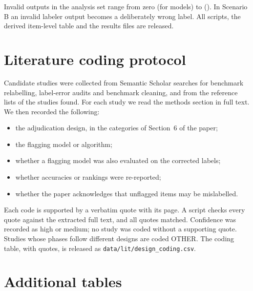\documentclass[twoside,11pt]{article}
\begin{document}
Invalid outputs in the analysis set range from zero (for \invalidZero{} models) to \invalidMax{} (\invalidMaxModel). In Scenario B an invalid labeler output becomes a deliberately wrong label. All scripts, the derived item-level table and the results files are released.

\section{Literature coding protocol}


Candidate studies were collected from Semantic Scholar searches for benchmark relabelling, label-error audits and benchmark cleaning, and from the reference lists of the studies found. For each study we read the methods section in full text. We then recorded the following:
\begin{itemize}
\item the adjudication design, in the categories of Section~6 of the paper;
\item the flagging model or algorithm;
\item whether a flagging model was also evaluated on the corrected labels;
\item whether accuracies or rankings were re-reported;
\item whether the paper acknowledges that unflagged items may be mislabelled.
\end{itemize}
Each code is supported by a verbatim quote with its page. A script checks every quote against the extracted full text, and all quotes matched. Confidence was recorded as high or medium; no study was coded without a supporting quote. Studies whose phases follow different designs are coded OTHER. The coding table, with quotes, is released as \texttt{data/lit/design\_coding.csv}.


\section{Additional tables}

\begin{table}[H]
\centering
\scriptsize

\caption{Scenario A (original MMLU labels): DR audits for every single-model flagger, ordered by true accuracy.}

\end{table}

\begin{table}[H]
\centering
\scriptsize

\caption{Sharp identified intervals (accuracy, \%) for the six most accurate models and the flagger (F) under assumed bounds $\varepsilon$ on the concordant label-error rate (Theorem~6 of the paper). Flaggers: GPT-4o in Scenario A, Llama 3 70B in Scenario B (Mixtral 8x7B labels).}

\end{table}
\end{document}
